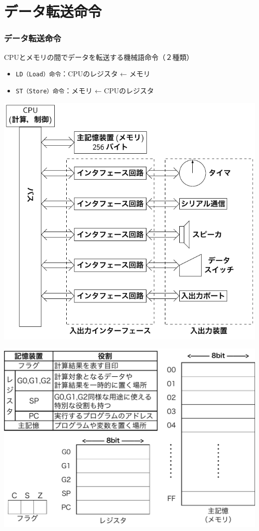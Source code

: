 \documentclass[handout]{beamer}        %
\begin{document}
\section{データ転送命令}
\begin{frame}
  \frametitle{データ転送命令}
  CPUとメモリの間でデータを転送する機械語命令（２種類）
  \begin{itemize}
  \item \texttt{LD（Load）命令}：CPUのレジスタ ← メモリ
  \item \texttt{ST（Store）命令}：メモリ ← CPUのレジスタ
  \end{itemize}
  \vfill
  \begin{minipage}{0.49\columnwidth}
  \centerline{\includegraphics[scale=0.63,clip,trim=0 3cm 3cm 0]
    {../Tikz/kousei2.pdf}}
  \end{minipage}
  \begin{minipage}{0.49\columnwidth}
  \centerline{\includegraphics[scale=0.18,clip,trim=8cm 0 0 0]
    {../Keynote/naibu-crop.pdf}}
  \end{minipage}
\end{frame}
\end{document}
